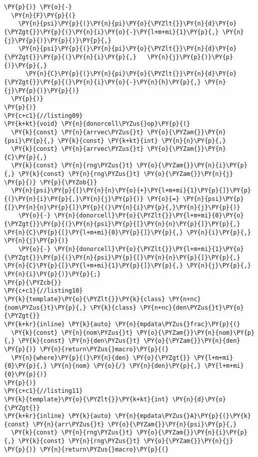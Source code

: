 \begin{Verbatim}[commandchars=\\\{\}]
  \PY{p}{)} \PY{o}{-}
  \PY{n}{F}\PY{p}{(}
    \PY{n}{psi}\PY{p}{(}\PY{n}{pi}\PY{o}{\PYZlt{}}\PY{n}{d}\PY{o}{\PYZgt{}}\PY{p}{(}\PY{n}{i}\PY{o}{-}\PY{l+m+mi}{1}\PY{p}{,} \PY{n}{j}\PY{p}{)}\PY{p}{)}\PY{p}{,} 
    \PY{n}{psi}\PY{p}{(}\PY{n}{pi}\PY{o}{\PYZlt{}}\PY{n}{d}\PY{o}{\PYZgt{}}\PY{p}{(}\PY{n}{i}\PY{p}{,}   \PY{n}{j}\PY{p}{)}\PY{p}{)}\PY{p}{,} 
      \PY{n}{C}\PY{p}{(}\PY{n}{pi}\PY{o}{\PYZlt{}}\PY{n}{d}\PY{o}{\PYZgt{}}\PY{p}{(}\PY{n}{i}\PY{o}{-}\PY{n}{h}\PY{p}{,} \PY{n}{j}\PY{p}{)}\PY{p}{)}
  \PY{p}{)}
\PY{p}{)}
\PY{c+c1}{//listing09}
\PY{k+kt}{void} \PY{n}{donorcell\PYZus{}op}\PY{p}{(}
  \PY{k}{const} \PY{n}{arrvec\PYZus{}t} \PY{o}{\PYZam{}}\PY{n}{psi}\PY{p}{,} \PY{k}{const} \PY{k+kt}{int} \PY{n}{n}\PY{p}{,}
  \PY{k}{const} \PY{n}{arrvec\PYZus{}t} \PY{o}{\PYZam{}}\PY{n}{C}\PY{p}{,} 
  \PY{k}{const} \PY{n}{rng\PYZus{}t} \PY{o}{\PYZam{}}\PY{n}{i}\PY{p}{,} \PY{k}{const} \PY{n}{rng\PYZus{}t} \PY{o}{\PYZam{}}\PY{n}{j}
\PY{p}{)} \PY{p}{\PYZob{}} 
  \PY{n}{psi}\PY{p}{[}\PY{n}{n}\PY{o}{+}\PY{l+m+mi}{1}\PY{p}{]}\PY{p}{(}\PY{n}{i}\PY{p}{,}\PY{n}{j}\PY{p}{)} \PY{o}{=} \PY{n}{psi}\PY{p}{[}\PY{n}{n}\PY{p}{]}\PY{p}{(}\PY{n}{i}\PY{p}{,}\PY{n}{j}\PY{p}{)}
    \PY{o}{-} \PY{n}{donorcell}\PY{o}{\PYZlt{}}\PY{l+m+mi}{0}\PY{o}{\PYZgt{}}\PY{p}{(}\PY{n}{psi}\PY{p}{[}\PY{n}{n}\PY{p}{]}\PY{p}{,} \PY{n}{C}\PY{p}{[}\PY{l+m+mi}{0}\PY{p}{]}\PY{p}{,} \PY{n}{i}\PY{p}{,} \PY{n}{j}\PY{p}{)}
    \PY{o}{-} \PY{n}{donorcell}\PY{o}{\PYZlt{}}\PY{l+m+mi}{1}\PY{o}{\PYZgt{}}\PY{p}{(}\PY{n}{psi}\PY{p}{[}\PY{n}{n}\PY{p}{]}\PY{p}{,} \PY{n}{C}\PY{p}{[}\PY{l+m+mi}{1}\PY{p}{]}\PY{p}{,} \PY{n}{j}\PY{p}{,} \PY{n}{i}\PY{p}{)}\PY{p}{;} 
\PY{p}{\PYZcb{}}
\PY{c+c1}{//listing10}
\PY{k}{template}\PY{o}{\PYZlt{}}\PY{k}{class} \PY{n+nc}{nom\PYZus{}t}\PY{p}{,} \PY{k}{class} \PY{n+nc}{den\PYZus{}t}\PY{o}{\PYZgt{}}
\PY{k+kr}{inline} \PY{k}{auto} \PY{n}{mpdata\PYZus{}frac}\PY{p}{(}
  \PY{k}{const} \PY{n}{nom\PYZus{}t} \PY{o}{\PYZam{}}\PY{n}{nom}\PY{p}{,} \PY{k}{const} \PY{n}{den\PYZus{}t} \PY{o}{\PYZam{}}\PY{n}{den}
\PY{p}{)} \PY{n}{return\PYZus{}macro}\PY{p}{(}
  \PY{n}{where}\PY{p}{(}\PY{n}{den} \PY{o}{\PYZgt{}} \PY{l+m+mi}{0}\PY{p}{,} \PY{n}{nom} \PY{o}{/} \PY{n}{den}\PY{p}{,} \PY{l+m+mi}{0}\PY{p}{)}
\PY{p}{)} 
\PY{c+c1}{//listing11}
\PY{k}{template}\PY{o}{\PYZlt{}}\PY{k+kt}{int} \PY{n}{d}\PY{o}{\PYZgt{}}
\PY{k+kr}{inline} \PY{k}{auto} \PY{n}{mpdata\PYZus{}A}\PY{p}{(}\PY{k}{const} \PY{n}{arr\PYZus{}t} \PY{o}{\PYZam{}}\PY{n}{psi}\PY{p}{,} 
  \PY{k}{const} \PY{n}{rng\PYZus{}t} \PY{o}{\PYZam{}}\PY{n}{i}\PY{p}{,} \PY{k}{const} \PY{n}{rng\PYZus{}t} \PY{o}{\PYZam{}}\PY{n}{j}
\PY{p}{)} \PY{n}{return\PYZus{}macro}\PY{p}{(}

\end{Verbatim}
